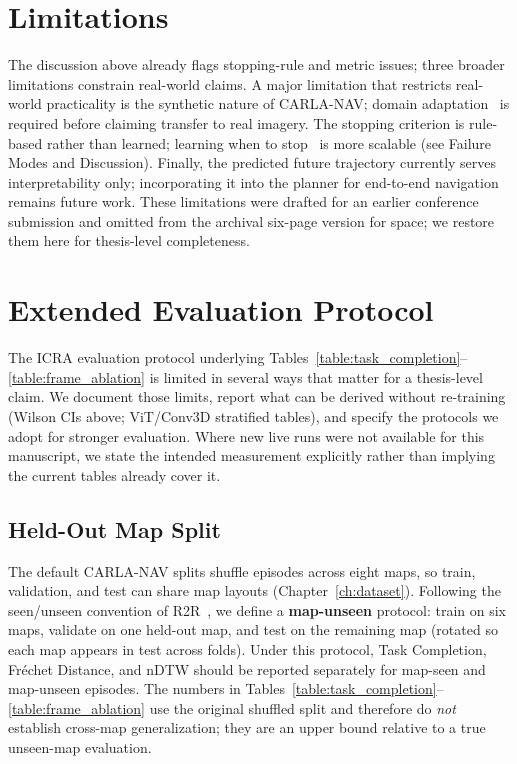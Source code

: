 \section{Limitations}
\label{sec:vln_limitations}

The discussion above already flags stopping-rule and metric issues; three broader limitations constrain real-world claims. A major limitation that restricts real-world practicality is the synthetic nature of CARLA-NAV; domain adaptation~\cite{kundu2021generalize,kang2020pixel} is required before claiming transfer to real imagery. The stopping criterion is rule-based rather than learned; learning when to stop~\cite{xiang-etal-2020-learning} is more scalable (see Failure Modes and Discussion). Finally, the predicted future trajectory currently serves interpretability only; incorporating it into the planner for end-to-end navigation remains future work. These limitations were drafted for an earlier conference submission and omitted from the archival six-page version for space; we restore them here for thesis-level completeness.

\section{Extended Evaluation Protocol}
\label{sec:extended_eval}

The ICRA evaluation protocol underlying Tables~\ref{table:task_completion}--\ref{table:frame_ablation} is limited in several ways that matter for a thesis-level claim. We document those limits, report what can be derived without re-training (Wilson CIs above; ViT/Conv3D stratified tables), and specify the protocols we adopt for stronger evaluation. Where new live runs were not available for this manuscript, we state the intended measurement explicitly rather than implying the current tables already cover it.

\subsection{Held-Out Map Split}

The default CARLA-NAV splits shuffle episodes across eight maps, so train, validation, and test can share map layouts (Chapter~\ref{ch:dataset}). Following the seen/unseen convention of R2R~\cite{anderson2018vision}, we define a \textbf{map-unseen} protocol: train on six maps, validate on one held-out map, and test on the remaining map (rotated so each map appears in test across folds). Under this protocol, Task Completion, Fr\'{e}chet Distance, and nDTW should be reported separately for map-seen and map-unseen episodes. The numbers in Tables~\ref{table:task_completion}--\ref{table:frame_ablation} use the original shuffled split and therefore do \emph{not} establish cross-map generalization; they are an upper bound relative to a true unseen-map evaluation.

